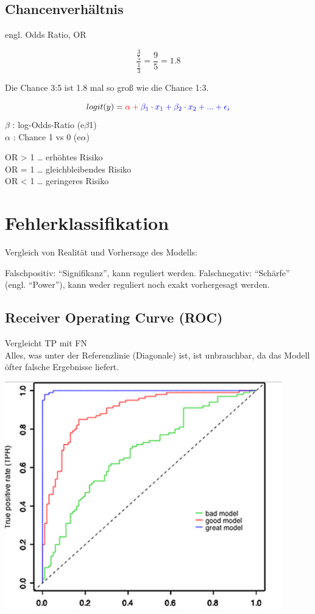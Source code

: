 \documentclass[
]{article}
\begin{document}
\hypertarget{chancenverhuxe4ltnis}{%
\subsection{Chancenverhältnis}\label{chancenverhuxe4ltnis}}

engl. Odds Ratio, OR

\[
\frac{\frac{3}{5}}{\frac{1}{3}} = \frac{9}{5} = 1.8
\]

Die Chance 3:5 ist 1.8 mal so groß wie die Chance 1:3.

\[
logit(y) = \color{red} \alpha + \color{blue} \beta_1 \cdot x_1 + \color{blue} \beta_2 \cdot x_2 + ... + \epsilon_i
\] {\(\beta\)} : log-Odds-Ratio (e{\(\beta\)1})\\
{\(\alpha\)} : Chance 1 vs 0 (e{\(\alpha\)})

OR \textgreater{} 1 \ldots{} erhöhtes Risiko\\
OR = 1 \ldots{} gleichbleibendes Risiko\\
OR \textless{} 1 \ldots{} geringeres Risiko\\
\clearpage

\hypertarget{fehlerklassifikation}{%
\section{Fehlerklassifikation}\label{fehlerklassifikation}}

Vergleich von Realität und Vorhersage des Modells:

Falschpositiv: ``Signifikanz'', kann reguliert werden. Falschnegativ:
``Schärfe'' (engl. ``Power''), kann weder reguliert noch exakt
vorhergesagt werden.

\hypertarget{receiver-operating-curve-roc}{%
\subsection{Receiver Operating Curve
(ROC)}\label{receiver-operating-curve-roc}}

Vergleicht TP mit FN\\
Alles, was unter der Referenzlinie (Diagonale) ist, ist unbrauchbar, da
das Modell öfter falsche Ergebnisse liefert.

\includegraphics[width=12cm, center]{Fig6}
\end{document}
